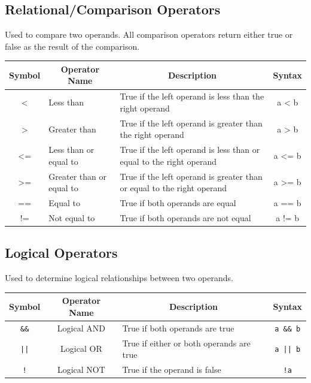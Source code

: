 \subsection{Relational/Comparison Operators}

Used to compare two operands.  
All comparison operators return either true or false as the result of the comparison.
\begin{center}
    \begin{tabular}{|c|p{3cm}|p{6cm}|c|}
        \hline
        \multicolumn{1}{|c|}{\textbf{Symbol}} &
        \multicolumn{1}{c|}{\textbf{Operator Name}} &
        \multicolumn{1}{c|}{\textbf{Description}} &
        \multicolumn{1}{c|}{\textbf{Syntax}} \\ \hline
        <   & Less than                 & True if the left operand is less than the right operand & a < b \\ \hline
        >   & Greater than              & True if the left operand is greater than the right operand & a > b \\ \hline
        <=  & Less than or equal to     & True if the left operand is less than or equal to the right operand & a <= b \\ \hline
        >=  & Greater than or equal to  & True if the left operand is greater than or equal to the right operand & a >= b \\ \hline
        ==  & Equal to                  & True if both operands are equal & a == b \\ \hline
        !=  & Not equal to              & True if both operands are not equal & a != b \\ \hline
    \end{tabular}
\end{center}

\subsection{Logical Operators}

Used to determine logical relationships between two operands.
\begin{center}
    \begin{tabular}{|c|c|p{7cm}|c|}
        \hline
        \multicolumn{1}{|c|}{\textbf{Symbol}} &
        \multicolumn{1}{c|}{\textbf{Operator Name}} &
        \multicolumn{1}{c|}{\textbf{Description}} &
        \multicolumn{1}{c|}{\textbf{Syntax}} \\ \hline
        \texttt{\&\&} & Logical AND & True if both operands are true & \texttt{a \&\& b} \\ \hline
        \texttt{||}   & Logical OR  & True if either or both operands are true & \texttt{a || b} \\ \hline
        \texttt{!}    & Logical NOT & True if the operand is false & \texttt{!a} \\ \hline
    \end{tabular}
\end{center}

